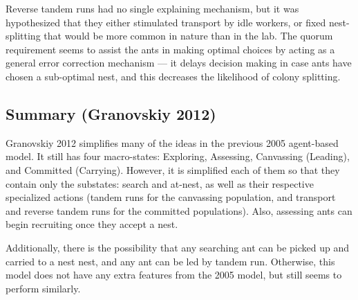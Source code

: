 \documentclass[letterpaper]{article}
\makeatletter
\def\mcolor#1#{\@mcolor{#1}}
\def\@mcolor#1#2#3{%
  \protect\leavevmode
  \begingroup
    \color#1{#2}#3%
  \endgroup
}
\newcommand{\sitem}[1]
{
    \begin{itemize}
        \item #1
    \end{itemize}
}
\makeatother
\begin{document}

Reverse tandem runs had no single explaining mechanism, but it was hypothesized that they either stimulated transport by idle workers, or fixed nest-splitting that would be more common in nature than in the lab.
The quorum requirement seems to assist the ants in making optimal choices by acting as a general error correction mechanism --- it delays decision making in case ants have chosen a sub-optimal nest, and this decreases the likelihood of colony splitting.

\subsection{Summary (Granovskiy 2012)}

Granovskiy 2012 simplifies many of the ideas in the previous 2005 agent-based model.
It still has four macro-states: Exploring, Assessing, Canvassing (Leading), and Committed (Carrying).
However, it is simplified each of them so that they contain only the substates: search and at-nest, as well as their respective specialized actions (tandem runs for the canvassing population, and transport and reverse tandem runs for the committed populations). 
Also, assessing ants can begin recruiting once they accept a nest.

Additionally, there is the possibility that any searching ant can be picked up and carried to a nest nest, and any ant can be led by tandem run.
Otherwise, this model does not have any extra features from the 2005 model, but still seems to perform similarly.
\end{document}
